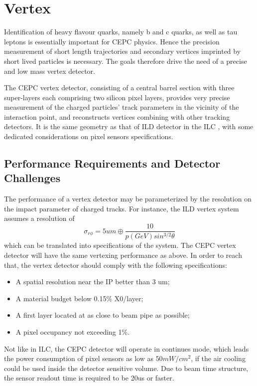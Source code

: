 \chapter{Vertex}
\label{Chapter:Vertex}
Identification of heavy flavour quarks, namely b and c quarks, as well as tau leptons is essentially important for CEPC physics. Hence the precision measurement of short length trajectories and secondary vertices imprinted by short lived particles is necessary. The goals therefore drive the need of a precise and low mass vertex detector.


The CEPC vertex detector, consisting of a central barrel section with three super-layers each comprising two silicon pixel layers, provides very precise measurement of the charged particles' track parameters in the vicinity of the interaction point, and reconstructs vertices combining with other tracking detectors. It is the same geometry as that of ILD detector in the ILC \cite{Behnke_2013}, with some dedicated considerations on pixel sensors specifications.

\section{Performance Requirements and Detector Challenges}

The performance of a vertex detector may be parameterized by the resolution on the impact parameter of charged tracks. For instance, the ILD vertex system assumes a resolution of
$$\sigma_{r\phi}=5um\oplus\frac{10}{p(GeV)sin^{3/2}\theta}$$
which can be translated into specifications of the system. The CEPC vertex detector will have the same vertexing performance as above. In order to reach that, the vertex detector should comply with the following specifications:
\begin{itemize}
	\item A spatial resolution near the IP better than 3 um;
	\item A material budget below 0.15\% X0/layer;
	\item A first layer located at as close to beam pipe as possible;
	\item A pixel occupancy not exceeding 1\%.
\end{itemize}


Not like in ILC, the CEPC detector will operate in continues mode, which leads the power consumption of pixel sensors as low as $50mW/cm^2$, if the air cooling could be used inside the detector sensitive volume. Due to beam time structure, the sensor readout time is required to be 20us or faster.



